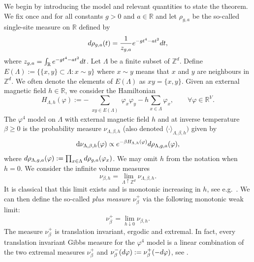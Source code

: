 \documentclass[11pt,a4paper]{article}
\theoremstyle{definition}
\numberwithin{equation}{section}
\newcommand\R{\mathbb{R}}
\newcommand\Z{\mathbb{Z}}
\begin{document}
We begin by introducing the model and relevant quantities to state the theorem. We fix once and for all constants $g>0$ and $a\in \R$ and let $\rho_{g,a}$ be the so-called single-site  measure on $\R$ defined by
\begin{equation}\label{eq:single_site}
    \textup{d}\rho_{g,a}(t)
    =
    \frac{1}{z_{g,a}}e^{-gt^4-at^2}\textup{d}t,
\end{equation}
where $z_{g,a}=\int_\R e^{-gt^4-at^2}\textup{d}t$. Let $\Lambda$ be a finite subset of $\mathbb Z^d$. Define $E(\Lambda):=\{\{x,y\}\subset \Lambda: x\sim y\}$ where $x\sim y$ means that $x$ and $y$ are neighbours in $\mathbb Z^d$. We often denote the elements of $E(\Lambda)$ as $xy=\{x,y\}$. Given an external magnetic field $h\in \mathbb R$, we consider the Hamiltonian 
\begin{equation}
    H_{\Lambda,h}(\varphi)
    :=
    -\sum_{\substack{xy\in E(\Lambda)}} \varphi_x\varphi_y - h\sum_{x\in \Lambda}\varphi_x, 	
    \qquad \forall \varphi\in \R^V.
\end{equation}
The $\varphi^4$ model on $\Lambda$ with external magnetic field $h$ and at inverse temperature $\beta\geq0$ is the probability measure $\nu_{\Lambda,\beta,h}$ (also denoted $\langle\cdot\rangle_{\Lambda,\beta,h})$ given by
\begin{equation}
    \mathrm{d}\nu_{\Lambda,\beta,h}(\varphi)
    \propto
    e^{-\beta H_{\Lambda,h}(\varphi)}\textup{d}\rho_{\Lambda,g,a}(\varphi),
\end{equation}
where $\textup{d}\rho_{\Lambda,g,a}(\varphi):=\prod_{x\in \Lambda}\textup{d}\rho_{g,a}(\varphi_x)$.
We may omit $h$ from the notation when $h=0$. We consider the infinite volume measures
\begin{equation}
    \nu_{\beta,h}=\lim_{\Lambda\uparrow \Z^d} \nu_{\Lambda,\beta,h}.
\end{equation}
It is classical that this limit exists and is monotonic increasing in $h$, see e.g.~\cite{GriffithsCorrelationsIsing1-1967}. 
We can then define the so-called \emph{plus measure} $\nu_\beta^+$ 
via the following monotonic weak limit:
\begin{equation}\label{eq:phi4_plus_def}
    \nu_\beta^+=\lim_{h\downarrow 0} \nu_{\beta,h}.
\end{equation}
The measure $\nu_\beta^+$ is translation invariant, ergodic and extremal. In fact, every translation invariant Gibbs measure for the $\varphi^4$ model is a linear combination of the two extremal measures $\nu_\beta^+$ and $\nu_\beta^-(\textup{d}\varphi):=\nu_\beta^+(-\textup{d}\varphi)$, see \cite{GunaratnamPanagiotisPanisSeveroPhi42022}.
\end{document}
